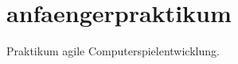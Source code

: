 \chapter{anfaengerpraktikum}
\hypertarget{index}{}\label{index}
\label{index_md__c_1_2_users_2_youssef_2_desktop_2_u_n_i_2_s4_2_computerspiel_entwicklung_2_das_spiel_2anfaengerpraktikum_2_r_e_a_d_m_e}%
%


Praktikum agile Computerspielentwicklung. 